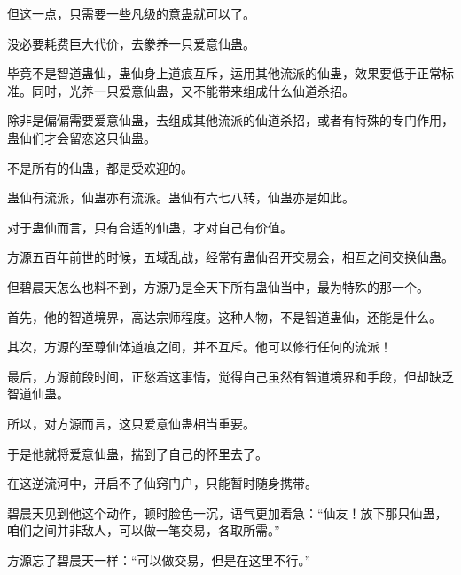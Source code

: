 \begin{this_body}
但这一点，只需要一些凡级的意蛊就可以了。

没必要耗费巨大代价，去豢养一只爱意仙蛊。

毕竟不是智道蛊仙，蛊仙身上道痕互斥，运用其他流派的仙蛊，效果要低于正常标准。同时，光养一只爱意仙蛊，又不能带来组成什么仙道杀招。

除非是偏偏需要爱意仙蛊，去组成其他流派的仙道杀招，或者有特殊的专门作用，蛊仙们才会留恋这只仙蛊。

不是所有的仙蛊，都是受欢迎的。

蛊仙有流派，仙蛊亦有流派。蛊仙有六七八转，仙蛊亦是如此。

对于蛊仙而言，只有合适的仙蛊，才对自己有价值。

方源五百年前世的时候，五域乱战，经常有蛊仙召开交易会，相互之间交换仙蛊。

但碧晨天怎么也料不到，方源乃是全天下所有蛊仙当中，最为特殊的那一个。

首先，他的智道境界，高达宗师程度。这种人物，不是智道蛊仙，还能是什么。

其次，方源的至尊仙体道痕之间，并不互斥。他可以修行任何的流派！

最后，方源前段时间，正愁着这事情，觉得自己虽然有智道境界和手段，但却缺乏智道仙蛊。

所以，对方源而言，这只爱意仙蛊相当重要。

于是他就将爱意仙蛊，揣到了自己的怀里去了。

在这逆流河中，开启不了仙窍门户，只能暂时随身携带。

碧晨天见到他这个动作，顿时脸色一沉，语气更加着急：“仙友！放下那只仙蛊，咱们之间并非敌人，可以做一笔交易，各取所需。”

方源忘了碧晨天一样：“可以做交易，但是在这里不行。”

\end{this_body}

